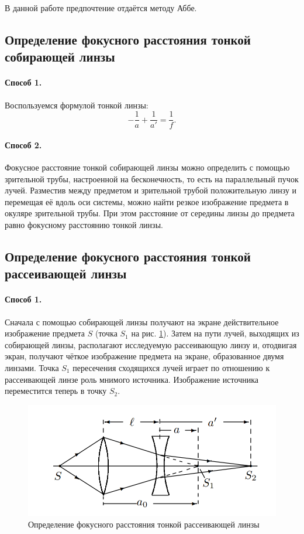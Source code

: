 \documentclass[a4paper, 12pt]{article}%
\newcommand{\picref}[1]{рис. \ref{#1}}
\begin{document}
	В данной работе предпочтение отдаётся методу Аббе.
	
	\subsection{Определение фокусного расстояния тонкой собирающей линзы}
	
	\paragraph{Способ 1.} Воспользуемся формулой тонкой линзы:
	\begin{equation}\label{thin-lens}
		-\frac{1}{a}+\frac{1}{a'} = \frac{1}{f}.
	\end{equation}
	\paragraph{Способ 2.}
	Фокусное расстояние тонкой собирающей линзы можно определить с помощью зрительной трубы, настроенной на бесконечность, то есть на параллельный пучок лучей. Разместив между предметом и зрительной трубой положительную линзу и перемещая её вдоль оси системы, можно найти резкое изображение предмета в окуляре зрительной трубы. При этом расстояние от середины линзы до предмета равно фокусному расстоянию тонкой линзы.
	
	\subsection{Определение фокусного расстояния тонкой рассеивающей линзы}
	
	\paragraph{Способ 1.} Сначала с помощью собирающей линзы получают на экране действительное изображение предмета $ S $ (точка $ S_1 $ на \picref{4}). Затем на пути лучей, выходящих из собирающей линзы, располагают исследуемую рассеивающую линзу и, отодвигая экран, получают чёткое изображение предмета на экране, образованное двумя линзами. Точка $ S_1 $ пересечения сходящихся лучей играет по отношению к рассеивающей линзе роль мнимого источника. Изображение источника переместится теперь в точку $ S_2 $. 
	
	\begin{figure}[tbp]
		\centering
		\includegraphics[width=0.8\linewidth]{Screenshot_5}
		\caption{Определение фокусного расстояния тонкой рассеивающей линзы}
		\label{4}
	\end{figure}
	
\end{document}
